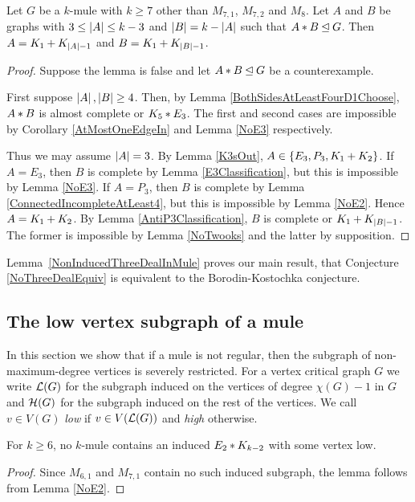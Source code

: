 \begin{lem}\label{NonInducedThreeDealInMule}
Let $G$ be a $k$-mule with $k \geq 7$ other than $M_{7,1}$, $M_{7,2}$ and $M_8$. 
Let $A$ and $B$ be graphs with $3 \leq \left|A\right| \leq k - 3$ and $\left|B\right| = k - \left|A\right|$ such that $A \mbox{\hspace{2 pt}$\ast$\hspace{2 pt}} B \unlhd G$. 
Then $A = K_1 \mbox{\hspace{2 pt}$+$\hspace{2 pt}} K_{\left|A\right| - 1}$ and $B = K_1 \mbox{\hspace{2 pt}$+$\hspace{2 pt}} K_{\left|B\right| - 1}$.
\end{lem}
\begin{proof}
Suppose the lemma is false and let $A \mbox{\hspace{2 pt}$\ast$\hspace{2 pt}} B \unlhd G$ be a counterexample.

First suppose $\left|A\right|, \left|B\right| \geq 4$. 
Then, by Lemma \ref{BothSidesAtLeastFourD1Choose}, $A \mbox{\hspace{2 pt}$\ast$\hspace{2 pt}} B$ is almost
complete or $K_5 \mbox{\hspace{2 pt}$\ast$\hspace{2 pt}} E_3$. The first and
second cases are impossible by Corollary \ref{AtMostOneEdgeIn} and Lemma
\ref{NoE3} respectively.

Thus we may assume $\left|A\right| = 3$.  By Lemma \ref{K3sOut}, $A \in \left\{ E_3,
P_3, K_1 \mbox{\hspace{2 pt}$+$\hspace{2 pt}} K_2 \right\}$.  If $A = E_3$, then $B$ is complete by Lemma
\ref{E3Classification}, but this is impossible by Lemma \ref{NoE3}.  If $A =
P_3$, then $B$ is complete by Lemma \ref{ConnectedIncompleteAtLeast4}, but this
is impossible by Lemma \ref{NoE2}.  Hence $A = K_1 \mbox{\hspace{2 pt}$+$\hspace{2 pt}} K_2$.  By Lemma
\ref{AntiP3Classification}, $B$ is complete or $K_1 \mbox{\hspace{2 pt}$+$\hspace{2 pt}} K_{\left|B\right| -
1}$.  The former is impossible by Lemma \ref{NoTwooks} and the latter by
supposition.
\end{proof}

Lemma~\ref{NonInducedThreeDealInMule} proves our main result, that Conjecture
\ref{NoThreeDealEquiv} is equivalent to the Borodin-Kostochka conjecture. 

\subsection{The low vertex subgraph of a mule}
In this section we show that if a mule is not regular, then the subgraph of
non-maximum-degree vertices is severely restricted. For a vertex critical graph
$G$ we write $\mathcal{L}(G)$ for the subgraph induced on the vertices of degree $\chi(G) - 1$ in $G$ and $\mathcal{H}(G)$ for the subgraph induced on the rest of the vertices.  We call $v \in V(G)$ \emph{low} if $v \in V(\mathcal{L}(G))$ and \emph{high} otherwise.

\begin{lem}\label{NoE2InSomeLow}
For $k \geq 6$, no $k$-mule contains an induced $E_2 \mbox{\hspace{2 pt}$\ast$\hspace{2 pt}} K_{k-2}$ with some
vertex low.
\end{lem}
\begin{proof}
Since $M_{6,1}$ and $M_{7,1}$ contain no such induced subgraph, the lemma
follows from Lemma \ref{NoE2}.
\end{proof}

